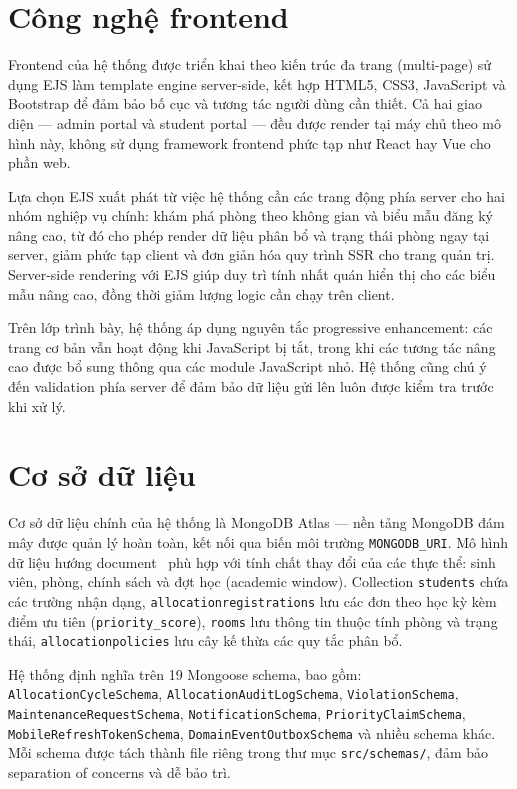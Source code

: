 ﻿\documentclass[a4paper,12pt,openany,oneside]{report}
\begin{document}
\section{Công nghệ frontend}

Frontend của hệ thống được triển khai theo kiến trúc đa trang (multi-page) sử
dụng EJS làm template engine server-side, kết hợp HTML5, CSS3, JavaScript và
Bootstrap để đảm bảo bố cục và tương tác người dùng cần thiết. Cả hai giao diện
--- admin portal và student portal --- đều được render tại máy chủ theo mô hình
này, không sử dụng framework frontend phức tạp như React hay Vue cho phần web.

Lựa chọn EJS xuất phát từ việc hệ thống cần các trang động phía server cho hai nhóm nghiệp vụ chính: khám phá phòng theo không gian và biểu mẫu đăng ký nâng cao, từ đó cho phép render dữ liệu phân bổ và trạng thái phòng ngay tại server, giảm phức tạp client và đơn giản hóa quy trình SSR cho trang quản trị. Server-side rendering với EJS giúp duy trì tính nhất quán hiển thị cho các biểu mẫu nâng cao, đồng thời giảm lượng logic cần chạy trên client.

Trên lớp trình bày, hệ thống áp dụng nguyên tắc progressive enhancement: các trang cơ bản vẫn hoạt động khi JavaScript bị tắt, trong khi các tương tác nâng cao được bổ sung thông qua các module JavaScript nhỏ. Hệ thống cũng chú ý đến validation phía server để đảm bảo dữ liệu gửi lên luôn được kiểm tra trước khi xử lý.

\section{Cơ sở dữ liệu}

Cơ sở dữ liệu chính của hệ thống là MongoDB Atlas --- nền tảng MongoDB đám mây
được quản lý hoàn toàn, kết nối qua biến môi trường \texttt{MONGODB\_URI}. Mô hình dữ liệu hướng document~\cite{mongodb2024datamodel} phù hợp với tính chất thay đổi của các thực thể: sinh viên, phòng, chính sách và đợt học (academic window). Collection \texttt{students} chứa các trường nhận dạng, \texttt{allocationregistrations} lưu các đơn theo học kỳ kèm điểm ưu tiên (\texttt{priority\_score}), \texttt{rooms} lưu thông tin thuộc tính phòng và trạng thái, \texttt{allocationpolicies} lưu cây kế thừa các quy tắc phân bổ.

Hệ thống định nghĩa trên 19 Mongoose schema, bao gồm: \texttt{AllocationCycleSchema}, \texttt{AllocationAuditLogSchema}, \texttt{ViolationSchema}, \texttt{MaintenanceRequestSchema}, \texttt{NotificationSchema}, \texttt{PriorityClaimSchema}, \texttt{MobileRefreshTokenSchema}, \texttt{DomainEventOutboxSchema} và nhiều schema khác. Mỗi schema được tách thành file riêng trong thư mục \texttt{src/schemas/}, đảm bảo separation of concerns và dễ bảo trì.
\end{document}
